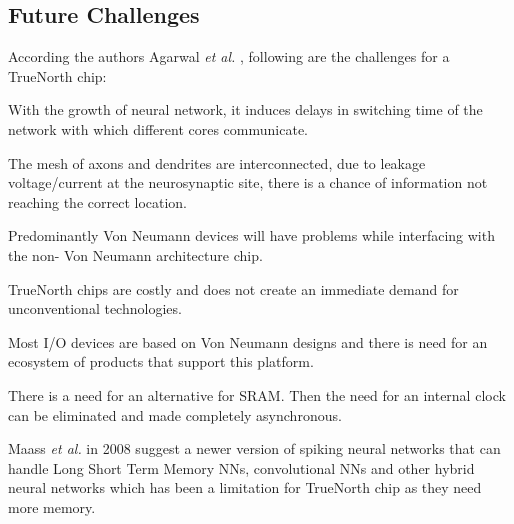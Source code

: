 \documentclass[11pt,twoside]{article}
\begin{document}
\subsection{Future Challenges}
According the authors Agarwal \textit{et al.} \cite{agarwal2015era}, following are the challenges for a TrueNorth chip:

\begin{compactenum}
	\item With the growth of neural network, it induces delays in switching time of the network with which different cores communicate.
	\item The mesh of axons and dendrites are interconnected, due to leakage voltage/current at the neurosynaptic site, there is a chance of information not reaching the correct location.
	\item Predominantly Von Neumann devices will have problems while interfacing with the non- Von Neumann architecture chip.
	\item TrueNorth chips are costly and does not create an immediate demand for unconventional technologies.
	\item Most I/O devices are based on Von Neumann designs and there is need for an ecosystem of products that support this platform.
	\item There is a need for an alternative for SRAM. Then the need for an internal clock can be eliminated and made completely asynchronous.
	\item Maass \textit{et al.} \cite{DBLP:journals/corr/abs-1803-09574} in 2008 suggest a newer version of spiking neural networks that can handle Long Short Term Memory NNs, convolutional NNs and other hybrid neural networks which has been a limitation for TrueNorth chip as they need more memory.
\end{compactenum}


\end{document}

